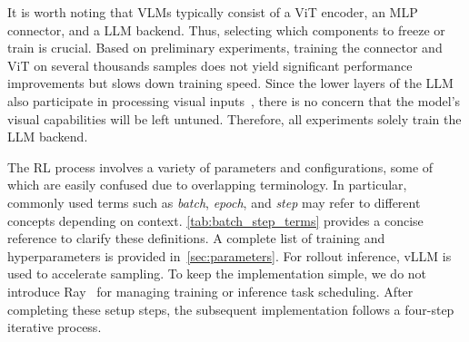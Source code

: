 \documentclass{article} %
\newcommand{\yan}[1]{\textcolor[RGB]{149,212,12}{[#1 - yan]}}
\begin{document}
%
%
%
It is worth noting that VLMs typically consist of a ViT encoder, an MLP connector, and a LLM backend.
%
Thus, selecting which components to freeze or train is crucial.
%
Based on preliminary experiments, training the connector and ViT on several thousands samples does not yield significant performance improvements but slows down training speed.
%
Since the lower layers of the LLM also participate in processing visual inputs~\citep{zhu2025remedy}, there is no concern that the model's visual capabilities will be left untuned. Therefore, all experiments solely train the LLM backend.


The RL process involves a variety of parameters and configurations, some of which are easily confused due to overlapping terminology. In particular, commonly used terms such as \textit{batch}, \textit{epoch}, and \textit{step} may refer to different concepts depending on context. \cref{tab:batch_step_terms} provides a concise reference to clarify these definitions.
%
A complete list of training and hyperparameters is provided in~\cref{sec:parameters}.
%
%
%
For rollout inference, vLLM \citep{kwon2023efficient} is used to accelerate sampling.
%
To keep the implementation simple, we do not introduce Ray~\citep{moritz2017ray} for managing training or inference task scheduling.
%
%
%
After completing these setup steps, the subsequent implementation follows a four-step iterative process.
\end{document}
